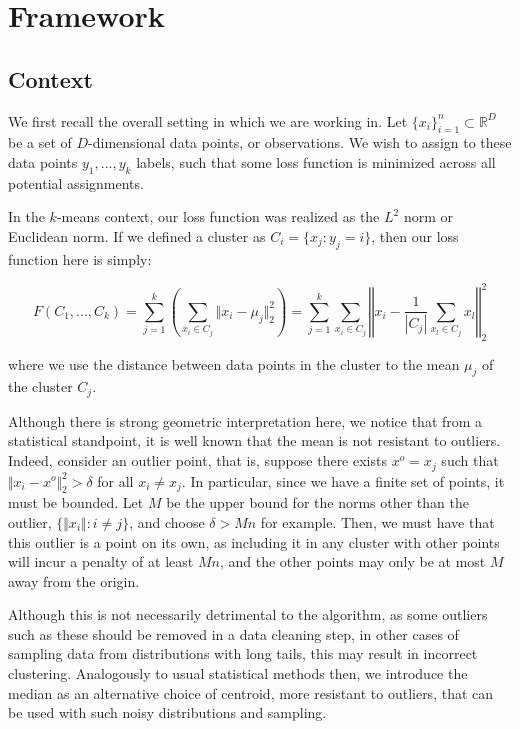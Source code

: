 \documentclass[10pt]{article}
\begin{document}
 

\section{Framework}

\subsection{Context}

We first recall the overall setting in which we are working in. Let $\{ x_i \}_{i=1}^n \subset \mathbb{R}^D$ be a set of $D$-dimensional data points, or observations. We wish to assign to these data points $y_1,...,y_k$ labels, such that some loss function is minimized across all potential assignments.

In the $k$-means context, our loss function was realized as the $L^2$ norm or Euclidean norm. If we defined a cluster as  $C_i = \{ x_j : y_j = i \}$, then our loss function here is simply:

$$ F(C_1,...,C_k) = \sum_{j=1}^k \left( \sum_{x_i \in C_j} \Vert x_i - \mu_j \Vert_2^2 \right) =  \sum_{j=1}^k \sum_{x_i \in C_j} \left\Vert x_i - \frac{1}{|C_j|}\sum_{x_l \in C_j} x_l \right\Vert_2^2 $$

where we use the distance between data points in the cluster to the mean $\mu_j$ of the cluster $C_j$.

Although there is strong geometric interpretation here, we notice that from a statistical standpoint, it is well known that the mean is not resistant to outliers. Indeed, consider an outlier point, that is, suppose there exists $x^o = x_j$ such that $\Vert x_i - x^o\Vert_2^2 > \delta$ for all $x_i \not = x_j$. In particular, since we have a finite set of points, it must be bounded. Let $M$ be the upper bound for the norms other than the outlier, $\{ \Vert x_i \Vert : i \not = j \}$, and choose $\delta > Mn$ for example. Then, we must have that this outlier is a point on its own, as including it in any cluster with other points will incur a penalty of at least $Mn$, and the other points may only be at most $M$ away from the origin. 

Although this is not necessarily detrimental to the algorithm, as some outliers such as these should be removed in a data cleaning step, in other cases of sampling data from distributions with long tails, this may result in incorrect clustering. Analogously to usual statistical methods then, we introduce the median as an alternative choice of centroid, more resistant to outliers, that can be used with such noisy distributions and sampling.
\end{document}
